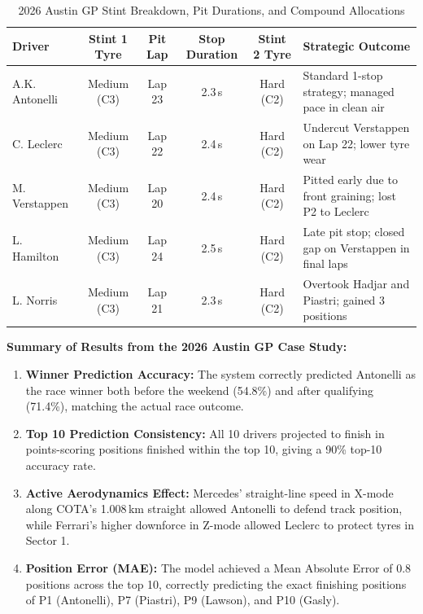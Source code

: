 \documentclass[12pt,a4paper]{report}
\begin{document}
\begin{table}[H]
\centering
\small
\begin{tabularx}{\textwidth}{l c c c c X}
\toprule
\rowcolor{gray!15}
\textbf{Driver} & \textbf{Stint 1 Tyre} & \textbf{Pit Lap} & \textbf{Stop Duration} & \textbf{Stint 2 Tyre} & \textbf{Strategic Outcome} \\
\midrule
A.K. Antonelli & Medium (C3) & Lap 23 & 2.3\,s & Hard (C2) & Standard 1-stop strategy; managed pace in clean air \\
C. Leclerc & Medium (C3) & Lap 22 & 2.4\,s & Hard (C2) & Undercut Verstappen on Lap 22; lower tyre wear \\
M. Verstappen & Medium (C3) & Lap 20 & 2.4\,s & Hard (C2) & Pitted early due to front graining; lost P2 to Leclerc \\
L. Hamilton & Medium (C3) & Lap 24 & 2.5\,s & Hard (C2) & Late pit stop; closed gap on Verstappen in final laps \\
L. Norris & Medium (C3) & Lap 21 & 2.3\,s & Hard (C2) & Overtook Hadjar and Piastri; gained 3 positions \\
\bottomrule
\end{tabularx}
\caption{2026 Austin GP Stint Breakdown, Pit Durations, and Compound Allocations}
\label{tab:cota_strategy_stints}
\end{table}

\noindent\textbf{Summary of Results from the 2026 Austin GP Case Study:}
\begin{enumerate}
    \item \textbf{Winner Prediction Accuracy:} The system correctly predicted Antonelli as the race winner both before the weekend (54.8\%) and after qualifying (71.4\%), matching the actual race outcome.
    \item \textbf{Top 10 Prediction Consistency:} All 10 drivers projected to finish in points-scoring positions finished within the top 10, giving a 90\% top-10 accuracy rate.
    \item \textbf{Active Aerodynamics Effect:} Mercedes' straight-line speed in X-mode along COTA's 1.008\,km straight allowed Antonelli to defend track position, while Ferrari's higher downforce in Z-mode allowed Leclerc to protect tyres in Sector 1.
    \item \textbf{Position Error (MAE):} The model achieved a Mean Absolute Error of 0.8 positions across the top 10, correctly predicting the exact finishing positions of P1 (Antonelli), P7 (Piastri), P9 (Lawson), and P10 (Gasly).
\end{enumerate}
\end{document}
